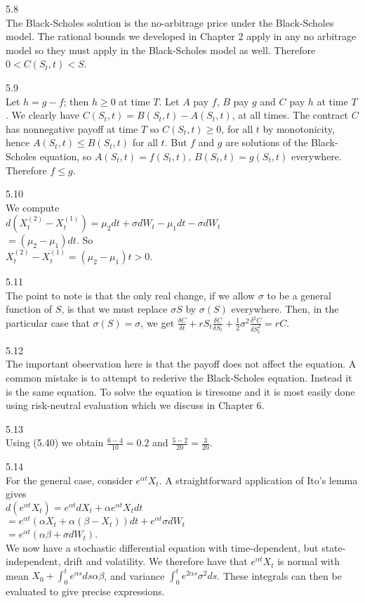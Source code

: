 5.8 \\
The Black-Scholes solution is the no-arbitrage price under the Black-Scholes model. The rational bounds we developed in Chapter 2 apply in any no arbitrage model so they must apply in the Black-Scholes model as well. Therefore $0 < C(S_t,t) < S$.

5.9 \\
Let $h=g-f$; then $h \ge 0$ at time $T$. Let $A$ pay $f$, $B$ pay $g$ and $C$ pay $h$ at time $T$. We clearly have $C(S_t,t) = B(S_t,t)-A(S_t,t)$, at all times. The contract $C$ has nonnegative payoff at time $T$ so $C(S_t,t) \ge 0$, for all $t$ by monotonicity, hence $A(S_t,t) \le B(S_t,t)$ for all $t$. But $f$ and $g$ are solutions of the Black-Scholes equation, so $A(S_t,t)=f(S_t,t)$, $B(S_t,t)=g(S_t,t)$ everywhere. Therefore $f \le g$.

5.10 \\
We compute \\
$d (X_t^{(2)} - X_t^{(1)})= \mu_2 dt + \sigma dW_t - \mu_1 dt - \sigma dW_t$ \\
$= (\mu_2 - \mu_1) dt$.
So \\
$X_t^{(2)}-X_t^{(1)} = (\mu_2 - \mu_1) t > 0$.

5.11 \\
The point to note is that the only real change, if we allow $\sigma$ to be a general function of $S$, is that we must replace $\sigma S$ by $\sigma (S)$ everywhere. Then, in the particular case that $\sigma (S)=\sigma$, we get $\frac{\delta C}{\delta t} + r S_t \frac{\delta C}{\delta S_t} + \frac{1}{2} \sigma^2 \frac{\delta^2 C}{\delta S_t^2} = rC$.

5.12 \\
The important observation here is that the payoff does not affect the equation. A common mistake is to attempt to rederive the Black-Scholes equation. Instead it is the same equation. To solve the equation is tiresome and it is most easily done using risk-neutral evaluation which we discuss in Chapter 6.

5.13 \\
Using (5.40) we obtain $\frac{6-4}{10} = 0.2$ and $\frac{5-2}{20} = \frac{3}{20}$.

5.14 \\
For the general case, consider $e^{\alpha t} X_t$. A straightforward application of Ito's lemma gives \\
$d(e^{\alpha t} X_t)=e^{\alpha t} dX_t + \alpha e^{\alpha t} X_t dt$ \\
$=e^{\alpha t} (\alpha X_t + \alpha (\beta - X_t))dt + e^{\alpha t} \sigma dW_t$ \\
$=e^{\alpha t} (\alpha \beta + \sigma dW_t)$. \\
We now have a stochastic differential equation with time-dependent, but state-independent, drift and volatility. We therefore have that $e^{\alpha t} X_t$ is normal with mean $X_0 + \int_0^t e^{\alpha s} ds \alpha \beta$, and variance $\int_0^t e^{2 \alpha s} \sigma^2 ds$. These integrals can then be evaluated to give precise expressions.

